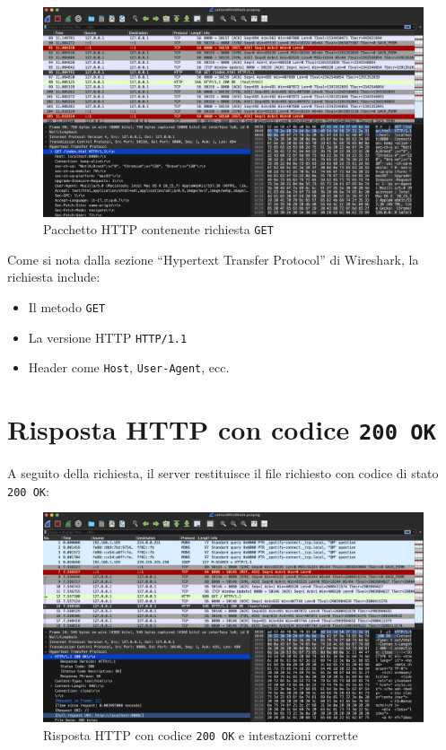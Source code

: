 \documentclass[a4paper,12pt]{report}
\begin{document}
\begin{figure}[H]
    \centering
    \includegraphics[width=1.0\textwidth]{Images/getRequest.png}
    \caption{Pacchetto HTTP contenente richiesta \texttt{GET}}
\end{figure}

Come si nota dalla sezione “Hypertext Transfer Protocol” di Wireshark, la richiesta include:
\begin{itemize}
    \item Il metodo \texttt{GET}
    \item La versione HTTP \texttt{HTTP/1.1}
    \item Header come \texttt{Host}, \texttt{User-Agent}, ecc.
\end{itemize}

\section{Risposta HTTP con codice \texttt{200 OK}}

A seguito della richiesta, il server restituisce il file richiesto con codice di stato \texttt{200 OK}:

\begin{figure}[H]
    \centering
    \includegraphics[width=1.0\textwidth]{Images/200.png}
    \caption{Risposta HTTP con codice \texttt{200 OK} e intestazioni corrette}
\end{figure}
\end{document}
